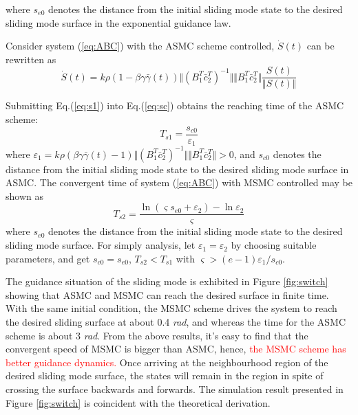 \documentclass[3p]{elsarticle}
\theoremstyle{plain}
\begin{document}
where $s_{e0}$ denotes the distance from the initial sliding mode state to the desired sliding mode surface in the exponential guidance law.\par
Consider system (\ref{eq:ABC}) with the ASMC scheme controlled, $\dot{S}(t)$ can be rewritten as
\begin{equation}
\dot{S}(t)= k\rho(1-\beta\gamma\bar{\gamma}(t))\Vert(B_1^T\bar{c}^T_2)^{-1}\Vert \Vert B^T_1\bar{c}_2^T\Vert \frac{S(t)}{\Vert S(t)\Vert}\label{eq:s1}
\end{equation}\par
Submitting Eq.(\ref{eq:s1}) into Eq.(\ref{eq:sc}) obtains the reaching time of the ASMC scheme:
\begin{equation}
T_{s1} = \frac{s_{c0}}{\varepsilon_1}
\end{equation}
where $\varepsilon_1 = k\rho(\beta\gamma\bar{\gamma}(t)-1)\Vert(B_1^T\bar{c}^T_2)^{-1}\Vert \Vert B^T_1\bar{c}_2^T\Vert > 0$, and $s_{c0}$ denotes the distance from the initial sliding mode state to the desired sliding mode surface in ASMC. The convergent time of system (\ref{eq:ABC}) with MSMC controlled may be shown as
\begin{equation}
T_{s2} = \frac{\ln (\varsigma s_{e0}+\varepsilon_2)-\ln\varepsilon_2}{\varsigma}
\end{equation}
where $s_{e0}$ denotes the distance from the initial sliding mode state to the desired sliding mode surface. For simply analysis, let $\varepsilon_1 = \varepsilon_2$ by choosing suitable parameters,  and get $s_{c0}=s_{e0}$, $T_{s2}<T_{s1}$ with $\varsigma>(e-1)\varepsilon_1/s_{c0}$.\par
The guidance situation of the sliding mode is exhibited in Figure \ref{fig:switch} showing that ASMC and MSMC can reach the desired surface in finite time. With the same initial condition, the MSMC scheme drives the system to reach the desired sliding surface at about 0.4 \textit{rad}, and whereas the time for the ASMC scheme is about 3 \textit{rad}. From the above results, it's easy to find that the convergent speed of MSMC is bigger than ASMC, hence, \textcolor{red}{the MSMC scheme has better guidance dynamics.} Once arriving at the neighbourhood region of the desired sliding mode surface, the states will remain in the region in spite of crossing the surface backwards and forwards. The simulation result presented in Figure \ref{fig:switch} is coincident with the theoretical derivation.\par
\end{document}
